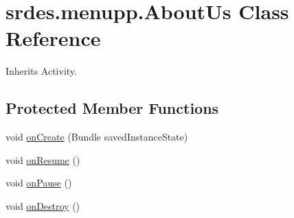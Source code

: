 \hypertarget{classsrdes_1_1menupp_1_1_about_us}{\section{srdes.\-menupp.\-About\-Us \-Class \-Reference}
\label{classsrdes_1_1menupp_1_1_about_us}
}


\-Inherits \-Activity.

\subsection*{\-Protected \-Member \-Functions}
\begin{DoxyCompactItemize}
\item 
void \hyperlink{classsrdes_1_1menupp_1_1_about_us_adc9370354829d9f1b45e572298bb6c7a}{on\-Create} (\-Bundle saved\-Instance\-State)
\item 
void \hyperlink{classsrdes_1_1menupp_1_1_about_us_a12de14b30d3b15bbf8c68cf7ee49fca1}{on\-Resume} ()
\item 
void \hyperlink{classsrdes_1_1menupp_1_1_about_us_aaba1721c9f56cb15e884bd90bed92dd2}{on\-Pause} ()
\item 
void \hyperlink{classsrdes_1_1menupp_1_1_about_us_af08b696698195e56d8c04f95ce041e98}{on\-Destroy} ()
\end{DoxyCompactItemize}



